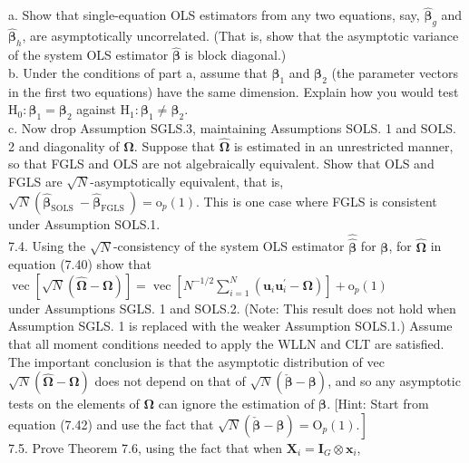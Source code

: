 \documentclass[10pt]{article}
\begin{document}
a. Show that single-equation OLS estimators from any two equations, say, $\hat{\boldsymbol{\beta}}_{g}$ and $\hat{\boldsymbol{\beta}}_{h}$, are asymptotically uncorrelated. (That is, show that the asymptotic variance of the system OLS estimator $\hat{\boldsymbol{\beta}}$ is block diagonal.)\\
b. Under the conditions of part a, assume that $\boldsymbol{\beta}_{1}$ and $\boldsymbol{\beta}_{2}$ (the parameter vectors in the first two equations) have the same dimension. Explain how you would test $\mathrm{H}_{0}: \boldsymbol{\beta}_{1}=\boldsymbol{\beta}_{2}$ against $\mathrm{H}_{1}: \boldsymbol{\beta}_{1} \neq \boldsymbol{\beta}_{2}$.\\
c. Now drop Assumption SGLS.3, maintaining Assumptions SOLS. 1 and SOLS. 2 and diagonality of $\boldsymbol{\Omega}$. Suppose that $\hat{\boldsymbol{\Omega}}$ is estimated in an unrestricted manner, so that FGLS and OLS are not algebraically equivalent. Show that OLS and FGLS are $\sqrt{N}$-asymptotically equivalent, that is, $\sqrt{N}\left(\hat{\boldsymbol{\beta}}_{\text {SOLS }}-\hat{\boldsymbol{\beta}}_{\text {FGLS }}\right)=\mathrm{o}_{p}(1)$. This is one case where FGLS is consistent under Assumption SOLS.1.\\
7.4. Using the $\sqrt{N}$-consistency of the system OLS estimator $\hat{\hat{\boldsymbol{\beta}}}$ for $\boldsymbol{\beta}$, for $\hat{\boldsymbol{\Omega}}$ in equation (7.40) show that\\
$\operatorname{vec}[\sqrt{N}(\hat{\boldsymbol{\Omega}}-\boldsymbol{\Omega})]=\operatorname{vec}\left[N^{-1 / 2} \sum_{i=1}^{N}\left(\mathbf{u}_{i} \mathbf{u}_{i}^{\prime}-\boldsymbol{\Omega}\right)\right]+\mathrm{o}_{p}(1)$\\
under Assumptions SGLS. 1 and SOLS.2. (Note: This result does not hold when Assumption SGLS. 1 is replaced with the weaker Assumption SOLS.1.) Assume that all moment conditions needed to apply the WLLN and CLT are satisfied. The important conclusion is that the asymptotic distribution of vec $\sqrt{N}(\hat{\boldsymbol{\Omega}}-\boldsymbol{\Omega})$ does not depend on that of $\sqrt{N}(\check{\boldsymbol{\beta}}-\boldsymbol{\beta})$, and so any asymptotic tests on the elements of $\boldsymbol{\Omega}$ can ignore the estimation of $\boldsymbol{\beta}$. [Hint: Start from equation (7.42) and use the fact that $\left.\sqrt{N}(\check{\boldsymbol{\beta}}-\boldsymbol{\beta})=\mathrm{O}_{p}(1).\right]$\\
7.5. Prove Theorem 7.6, using the fact that when $\mathbf{X}_{i}=\mathbf{I}_{G} \otimes \mathbf{x}_{i}$,\\
\end{document}
